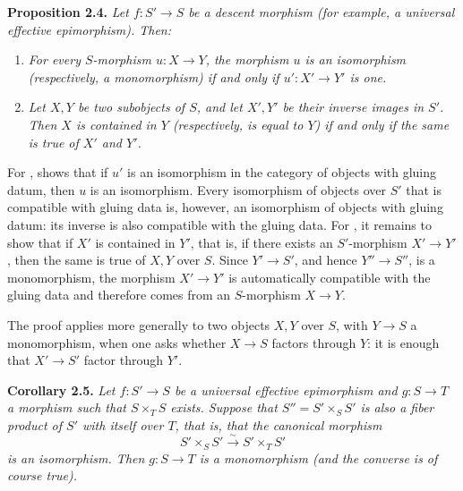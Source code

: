 \medskip
\noindent{}\textbf{Proposition 2.4.}
\textit{Let \(f:S'\to S\) be a descent morphism (for example, a universal
effective epimorphism). Then:}
\begin{enumerate}
  \item[(a)] \textit{For every \(S\)-morphism \(u:X\to Y\), the morphism
    \(u\) is an isomorphism (respectively, a monomorphism) if and only if
    \(u':X'\to Y'\) is one.}
  \item[(b)] \textit{Let \(X,Y\) be two subobjects of \(S\), and let
    \(X',Y'\) be their inverse images in \(S'\). Then \(X\) is contained in
    \(Y\) (respectively, is equal to \(Y\)) if and only if the same is true
    of \(X'\) and \(Y'\).}
\end{enumerate}

For ,  shows that if \(u'\) is an isomorphism in the
category of objects with gluing datum, then \(u\) is an isomorphism. Every
isomorphism of objects over \(S'\) that is compatible with gluing data is,
however, an isomorphism of objects with gluing datum: its inverse is also
compatible with the gluing data. For , it remains to show that if \(X'\)
is contained in \(Y'\), that is, if there exists an \(S'\)-morphism
\(X'\to Y'\), then the same is true of \(X,Y\) over \(S\). Since
\(Y'\to S'\), and hence \(Y''\to S''\), is a monomorphism, the morphism
\(X'\to Y'\) is automatically compatible with the gluing data and therefore
comes from an \(S\)-morphism \(X\to Y\).

The proof applies more generally to two objects \(X,Y\) over \(S\), with
\(Y\to S\) a monomorphism, when one asks whether \(X\to S\) factors through
\(Y\): it is enough that \(X'\to S'\) factor through \(Y'\).

\medskip
\noindent{}\textbf{Corollary 2.5.}
\textit{Let \(f:S'\to S\) be a universal effective epimorphism and
\(g:S\to T\) a morphism such that \(S\times_TS\) exists. Suppose that
\(S''=S'\times_SS'\) is also a fiber product of \(S'\) with itself over
\(T\), that is, that the canonical morphism}
\[
  S'\times_SS'\xrightarrow{\sim}S'\times_TS'
\]
\textit{is an isomorphism. Then \(g:S\to T\) is a monomorphism (and the
converse is of course true).}

